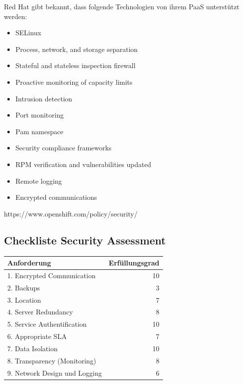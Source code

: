 \documentclass[12pt,a4paper]{article}
\begin{document}
Red Hat gibt bekannt, dass folgende Technologien von ihrem PaaS unterstützt werden:

\begin{itemize}
    \item SELinux
    \item Process, network, and storage separation
    \item Stateful and stateless inspection firewall
    \item Proactive monitoring of capacity limits
    \item Intrusion detection
    \item Port monitoring
    \item Pam namespace
    \item Security compliance frameworks
    \item RPM verification and vulnerabilities updated
    \item Remote logging
    \item Encrypted communications
\end{itemize}
https://www.openshift.com/policy/security/

\subsection{Checkliste Security Assessment}


\begin{table}[H]
    \begin{tabular}{lr}
    \hline
    \textbf{Anforderung}                   & \textbf{Erfüllungsgrad} \\ \hline
    1. Encrypted Communication             & 10                      \\
    2. Backups                             & 3                       \\
    3. Location                            & 7                       \\
    4. Server Redundancy                   & 8                       \\
    5. Service Authentification            & 10                      \\
    6. Appropriate SLA                     & 7                       \\
    7. Data Isolation                      & 10                      \\
    8. Transparency (Monitoring)           & 8                       \\
    9. Network Design und Logging          & 6                       \\ \hline
    \end{tabular}
\end{table}
\end{document}
